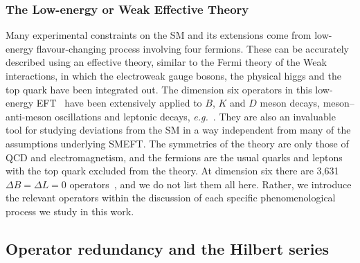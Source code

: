 \begin{table}
\begin{center}
    \caption{The table shows the operators featuring in the Warsaw
      basis~\cite{Buchmuller:1985jz, Grzadkowski:2010es} of the dimension-six
      SMEFT that are not four-fermion operators. We point the reader to
      Appendix~\ref{chapter:math-notation} for the correspondence between the
      four-component notation used here and the two-component notation used
      elsewhere in this work for spinors, along with the definition of
      $\bar{D}^{\mu}$. Flavor indices are omitted and should be understood to
      act on fermions in the order $\{r, s\}$ as they appear in each
      operator. \label{tab:smeft-d6-other}}
  \end{center}
\end{table}

\subsubsection{The Low-energy or Weak Effective Theory}

Many experimental constraints on the SM and its extensions come from low-energy
flavour-changing process involving four fermions. These can be accurately
described using an effective theory, similar to the Fermi theory of the Weak
interactions, in which the electroweak gauge bosons, the physical higgs and the
top quark have been integrated out. The dimension six operators in this
low-energy EFT~\cite{Jenkins:2017jig, Aebischer:2017gaw, Jenkins:2017dyc,
  Aebischer:2015fzz} have been extensively applied to $B$, $K$ and $D$ meson
decays, meson--anti-meson oscillations and leptonic decays,
\textit{e.g.}~\cite{Buchalla:1995vs}. They are also an invaluable tool for
studying deviations from the SM in a way independent from many of the
assumptions underlying SMEFT. The symmetries of the theory are only those of QCD
and electromagnetism, and the fermions are the usual quarks and leptons with the
top quark excluded from the theory. At dimension six there are 3,631
$\Delta B = \Delta L = 0$ operators~\cite{Jenkins:2017jig}, and we do not list
them all here. Rather, we introduce the relevant operators within the discussion
of each specific phenomenological process we study in this work.

\subsection{Operator redundancy and the Hilbert series}

